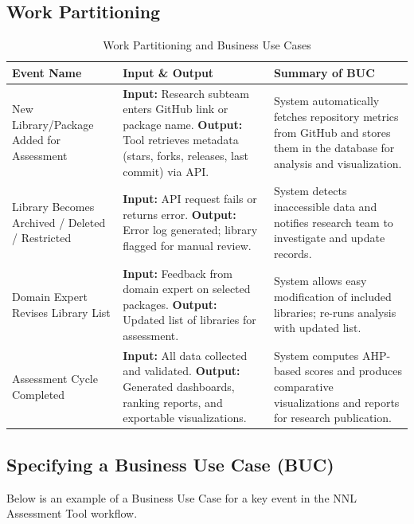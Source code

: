 \documentclass[12pt]{article}
\begin{document}
\subsection{Work Partitioning}
\begin{table}[H]
\centering
\caption{Work Partitioning and Business Use Cases}
\begin{tabularx}{\textwidth}{|p{3.5cm}|X|X|}
\hline
\textbf{Event Name} & \textbf{Input \& Output} & \textbf{Summary of BUC} \\ \hline

New Library/Package Added for Assessment &
\textbf{Input:} Research subteam enters GitHub link or package name.  
\textbf{Output:} Tool retrieves metadata (stars, forks, releases, last commit) via API. &
System automatically fetches repository metrics from GitHub and stores them in the database for analysis and visualization. \\ \hline

Library Becomes Archived / Deleted / Restricted &
\textbf{Input:} API request fails or returns error.  
\textbf{Output:} Error log generated; library flagged for manual review. &
System detects inaccessible data and notifies research team to investigate and update records. \\ \hline

Domain Expert Revises Library List &
\textbf{Input:} Feedback from domain expert on selected packages.  
\textbf{Output:} Updated list of libraries for assessment. &
System allows easy modification of included libraries; re-runs analysis with updated list. \\ \hline

Assessment Cycle Completed &
\textbf{Input:} All data collected and validated.  
\textbf{Output:} Generated dashboards, ranking reports, and exportable visualizations. &
System computes AHP-based scores and produces comparative visualizations and reports for research publication. \\ \hline

\end{tabularx}
\end{table}

\subsection{Specifying a Business Use Case (BUC)}
Below is an example of a Business Use Case for a key event in the NNL Assessment Tool workflow.
\end{document}
